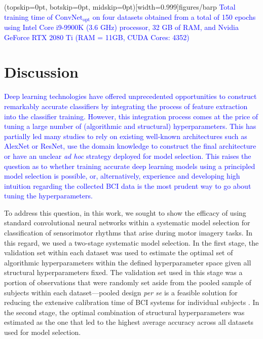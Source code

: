 \documentclass{ieeeaccess}
\begin{document}
{\Figure[t!](topskip=0pt, botskip=0pt, midskip=0pt)[width=0.999\linewidth]{figures/barp}
{\textcolor{blue}{Total training time of $\text{ConvNet}_{\text{opt}}$ on four datasets obtained from a total of 150 epochs using Intel Core i9-9900K (3.6 GHz) processor, 32 GB of RAM, and Nvidia GeForce RTX 2080 Ti (RAM = 11GB,  CUDA Cores: 4352) \label{fig:train_time}}}

   
\section{Discussion}
\label{sec:discussion}
{\textcolor{blue}{Deep learning technologies have offered unprecedented opportunities to construct remarkably accurate classifiers by integrating the process of feature extraction into the classifier training. However, this integration process comes at the price of tuning a large number of (algorithmic and structural) hyperparameters. This has partially led many studies to rely on existing well-known architectures such as AlexNet or ResNet, use the domain knowledge to construct the final architecture or have an unclear \textit{ad hoc} strategy deployed for model selection. This raises the question as to whether training accurate deep learning models using a principled model selection is possible, or, alternatively, experience and developing high intuition regarding the collected BCI data is the most prudent way to go about tuning the hyperparameters. }
    
To address this question, in this work, we sought to show the efficacy of using standard convolutional neural networks within a systematic model selection for classification of sensorimotor rhythms that arise during motor imagery tasks. In this regard, we used a two-stage systematic model selection. In the first stage, the validation set within each dataset was used to estimate the optimal set of algorithmic hyperparameters within the defined hyperparameter space given all structural hyperparameters fixed. The validation set used in this stage was a portion of observations that were randomly set aside from the pooled sample of subjects within each dataset---pooled design \textit{per se} is a feasible solution for reducing the extensive calibration time of BCI systems for individual subjects \cite{Lotte2015}. In the second stage, the optimal combination of structural hyperparameters was estimated as the one that led to the highest average accuracy across all datasets used for model selection.} 

}
\end{document}
